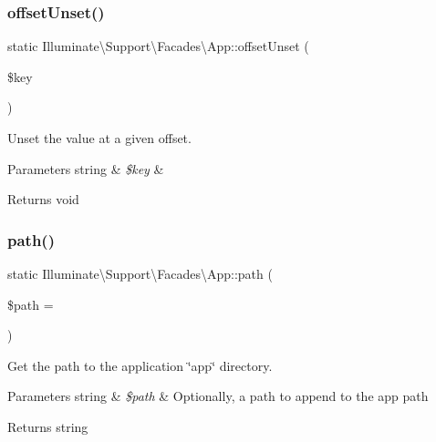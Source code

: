 \subsubsection{\texorpdfstring{offset\+Unset()}{offsetUnset()}}
{\footnotesize\ttfamily static Illuminate\textbackslash{}\+Support\textbackslash{}\+Facades\textbackslash{}\+App\+::offset\+Unset (\begin{DoxyParamCaption}\item[{}]{\$key }\end{DoxyParamCaption})\hspace{0.3cm}{\ttfamily [static]}}

Unset the value at a given offset.


\begin{DoxyParams}[1]{Parameters}
string & {\em \$key} & \\
\hline
\end{DoxyParams}
\begin{DoxyReturn}{Returns}
void 
\end{DoxyReturn}
\mbox{\label{class_illuminate_1_1_support_1_1_facades_1_1_app_a7200f5a02f461cd9329772f8fbffd35c}} 
\subsubsection{\texorpdfstring{path()}{path()}}
{\footnotesize\ttfamily static Illuminate\textbackslash{}\+Support\textbackslash{}\+Facades\textbackslash{}\+App\+::path (\begin{DoxyParamCaption}\item[{}]{\$path = {\ttfamily \textquotesingle{}\textquotesingle{}} }\end{DoxyParamCaption})\hspace{0.3cm}{\ttfamily [static]}}

Get the path to the application \char`\"{}app\char`\"{} directory.


\begin{DoxyParams}[1]{Parameters}
string & {\em \$path} & Optionally, a path to append to the app path \\
\hline
\end{DoxyParams}
\begin{DoxyReturn}{Returns}
string 
\end{DoxyReturn}
\mbox{\label{class_illuminate_1_1_support_1_1_facades_1_1_app_acb93eb8d4d24729b8264c00e5b94dfb1}} 

